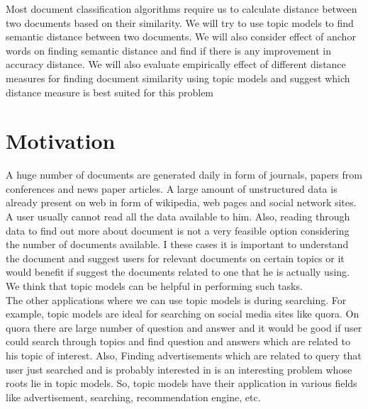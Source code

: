 \documentclass[a4paper,11pt]{article}
\begin{document}
Most document classification algorithms require us to calculate distance between two documents based on their similarity. We will try to use topic models to find semantic distance between two documents. We will also consider effect of anchor words on finding semantic distance and find if there is any improvement in accuracy distance. We will also evaluate empirically effect of different distance measures for finding document similarity using topic models and suggest which distance measure is best suited for this problem

\pagebreak
\section{Motivation}
A huge number of documents are generated daily in form of journals, papers from conferences and  news paper articles. A large amount of unstructured data is already present on web in form of wikipedia, web pages and social network sites. A user usually cannot read all the data available to him. Also, reading through data to find out more about document is not a very feasible option considering the number of documents available. I these cases it is important to understand the document and suggest users for relevant documents on certain topics or it would benefit if suggest the documents related to one that he is actually using. We think that topic models can be helpful in performing such tasks. \\

The other applications where we can use topic models is during searching. For example, topic models are ideal for searching on social media sites like quora. On quora there are large number of question and answer and it would be good if user could search through topics and find question and answers which are related to his topic of interest. Also, Finding advertisements which are related to query that user just searched and is probably interested in is an interesting problem whose roots lie in topic models. So, topic models have their application in various fields like advertisement, searching, recommendation engine, etc. \\
\end{document}
